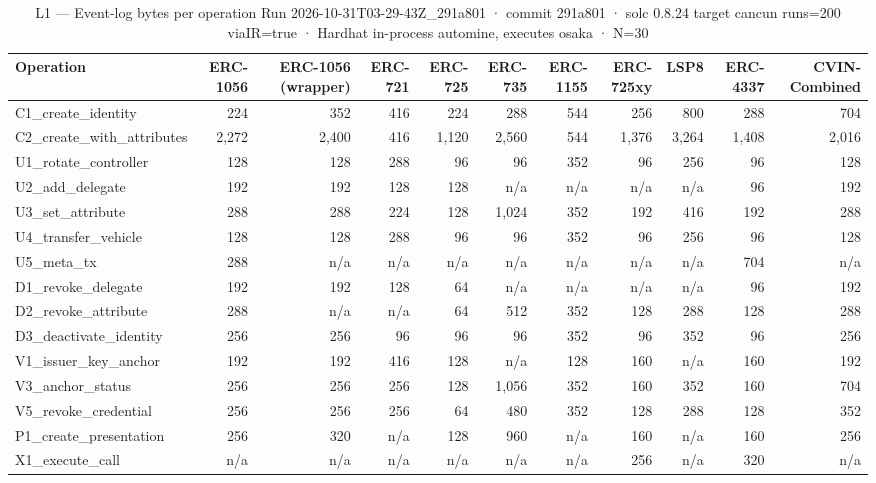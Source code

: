 \begin{table}[ht]
\centering
\small
\begin{tabular}{lrrrrrrrrrr}
\toprule
Operation & ERC-1056 & ERC-1056 (wrapper) & ERC-721 & ERC-725 & ERC-735 & ERC-1155 & ERC-725xy & LSP8 & ERC-4337 & CVIN-Combined \\
\midrule
C1\_create\_identity & 224 & 352 & 416 & 224 & 288 & 544 & 256 & 800 & 288 & 704 \\
C2\_create\_with\_attributes & 2,272 & 2,400 & 416 & 1,120 & 2,560 & 544 & 1,376 & 3,264 & 1,408 & 2,016 \\
U1\_rotate\_controller & 128 & 128 & 288 & 96 & 96 & 352 & 96 & 256 & 96 & 128 \\
U2\_add\_delegate & 192 & 192 & 128 & 128 & n/a & n/a & n/a & n/a & 96 & 192 \\
U3\_set\_attribute & 288 & 288 & 224 & 128 & 1,024 & 352 & 192 & 416 & 192 & 288 \\
U4\_transfer\_vehicle & 128 & 128 & 288 & 96 & 96 & 352 & 96 & 256 & 96 & 128 \\
U5\_meta\_tx & 288 & n/a & n/a & n/a & n/a & n/a & n/a & n/a & 704 & n/a \\
D1\_revoke\_delegate & 192 & 192 & 128 & 64 & n/a & n/a & n/a & n/a & 96 & 192 \\
D2\_revoke\_attribute & 288 & n/a & n/a & 64 & 512 & 352 & 128 & 288 & 128 & 288 \\
D3\_deactivate\_identity & 256 & 256 & 96 & 96 & 96 & 352 & 96 & 352 & 96 & 256 \\
V1\_issuer\_key\_anchor & 192 & 192 & 416 & 128 & n/a & 128 & 160 & n/a & 160 & 192 \\
V3\_anchor\_status & 256 & 256 & 256 & 128 & 1,056 & 352 & 160 & 352 & 160 & 704 \\
V5\_revoke\_credential & 256 & 256 & 256 & 64 & 480 & 352 & 128 & 288 & 128 & 352 \\
P1\_create\_presentation & 256 & 320 & n/a & 128 & 960 & n/a & 160 & n/a & 160 & 256 \\
X1\_execute\_call & n/a & n/a & n/a & n/a & n/a & n/a & 256 & n/a & 320 & n/a \\
\bottomrule
\end{tabular}
\caption{L1 — Event-log bytes per operation Run 2026-10-31T03-29-43Z\_291a801 · commit 291a801 · solc 0.8.24 target cancun runs=200 viaIR=true · Hardhat in-process automine, executes osaka · N=30}
\label{tab:crud_logbytes}
\end{table}
